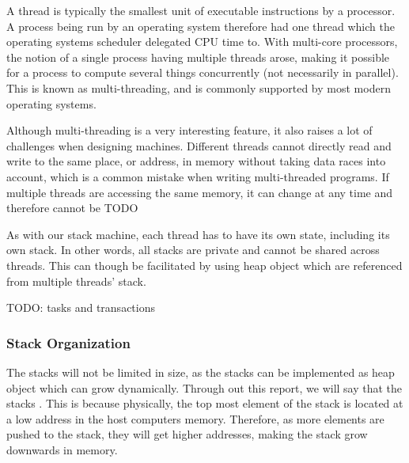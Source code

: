 A thread is typically the smallest unit of executable instructions by a
processor. A process being run by an operating system therefore had one thread
which the operating systems scheduler delegated CPU time to. With multi-core
processors, the notion of a single process having multiple threads arose, making
it possible for a process to compute several things concurrently (not
necessarily in parallel). This is known as multi-threading, and is commonly
supported by most modern operating systems.

Although multi-threading is a very interesting feature, it also raises a lot of
challenges when designing machines. Different threads cannot directly read and
write to the same place, or address, in memory without taking data races into
account, which is a common mistake when writing multi-threaded programs. If
multiple threads are accessing the same memory, it can change at any time and
therefore cannot be TODO

As with our stack machine, each thread has to have its own state, including its
own stack. In other words, all stacks are private and cannot be shared across
threads. This can though be facilitated by using heap object which are
referenced from multiple threads' stack.

TODO: tasks and transactions


\subsubsection{Stack Organization}

The stacks will not be limited in size, as the stacks can be implemented as heap
object which can grow dynamically. Through out this report, we will say that the
stacks . This is because physically, the top most element
of the stack is located at a low address in the host computers
memory. Therefore, as more elements are pushed to the stack, they will get
higher addresses, making the stack grow downwards in memory.

